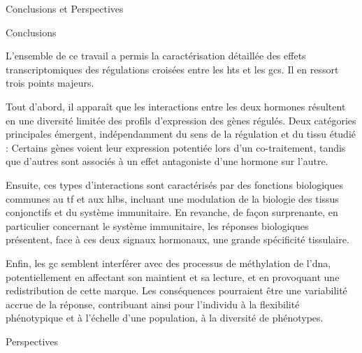 \documentclass[../main.tex]{subfiles}
\begin{document}
\begin{chapter}{Conclusions et Perspectives}


\begin{section}{Conclusions}

L'ensemble de ce travail a permis la caractérisation détaillée des effets transcriptomiques des régulations croisées entre les \glspl{ht} et les \glspl{gc}.
Il en ressort trois points majeurs.
\par
Tout d'abord, il apparaît que les interactions entre les deux hormones résultent en une diversité limitée des profils d'expression des gènes régulés.
Deux catégories principales émergent, indépendamment du sens de la régulation et du tissu étudié :
Certains gènes voient leur expression potentiée lors d'un co-traitement, tandis que d'autres sont associés à un effet antagoniste d'une hormone sur l'autre.
\par
Ensuite, ces types d'interactions sont caractérisés par des fonctions biologiques communes au \gls{tf} et aux \glspl{hlb}, incluant une modulation de la biologie des tissus conjonctifs et du système immunitaire.
En revanche, de façon surprenante, en particulier concernant le système immunitaire, les réponses biologiques présentent, face à ces deux signaux hormonaux, une grande spécificité tissulaire.
\par
Enfin, les \gls{gc} semblent interférer avec des processus de méthylation de l'\gls{dna}, potentiellement en affectant son maintient et sa lecture, et en provoquant une redistribution de cette marque.
Les conséquences pourraient être une variabilité accrue de la réponse, contribuant ainsi pour l'individu à la flexibilité phénotypique et à l'échelle d'une population, à la diversité de phénotypes.

\end{section}


\begin{section}{Perspectives}


\end{section}
\end{chapter}
\end{document}
